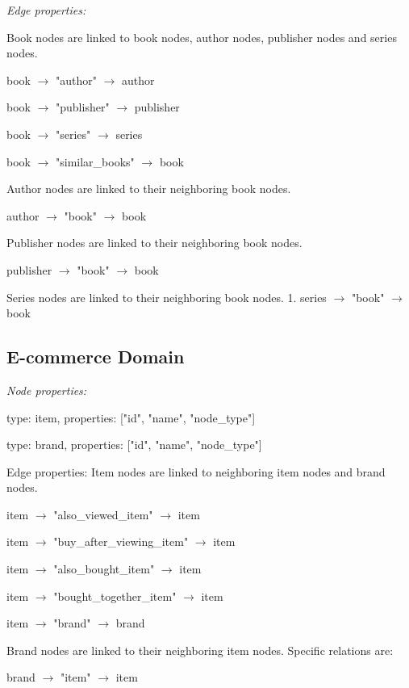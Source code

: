 \textit{Edge properties:}

Book nodes are linked to book nodes, author nodes, publisher nodes and series nodes.
\squishlist
\item book $\rightarrow$ "author" $\rightarrow$ author
\item book $\rightarrow$ "publisher" $\rightarrow$ publisher
\item book $\rightarrow$ "series" $\rightarrow$ series
\item book $\rightarrow$ "similar\_books" $\rightarrow$ book
\squishend

Author nodes are linked to their neighboring book nodes.
\squishlist
\item author $\rightarrow$ "book" $\rightarrow$ book
\squishend

Publisher nodes are linked to their neighboring book nodes.
\squishlist
\item publisher $\rightarrow$ "book" $\rightarrow$ book
\squishend

Series nodes are linked to their neighboring book nodes.
1. series $\rightarrow$ "book" $\rightarrow$ book

\subsection{E-commerce Domain}

\textit{Node properties:}
\squishlist
\item type: item, properties: ["id", "name", "node\_type"]
\item type: brand, properties: ["id", "name", "node\_type"]
\squishend

Edge properties:
Item nodes are linked to neighboring item nodes and brand nodes.
\squishlist
\item item $\rightarrow$ "also\_viewed\_item" $\rightarrow$ item
\item item $\rightarrow$ "buy\_after\_viewing\_item" $\rightarrow$ item
\item item $\rightarrow$ "also\_bought\_item" $\rightarrow$ item
\item item $\rightarrow$ "bought\_together\_item" $\rightarrow$ item
\item item $\rightarrow$ "brand" $\rightarrow$ brand
\squishend

Brand nodes are linked to their neighboring item nodes. Specific relations are:
\squishlist
\item brand $\rightarrow$ "item" $\rightarrow$ item
\squishend